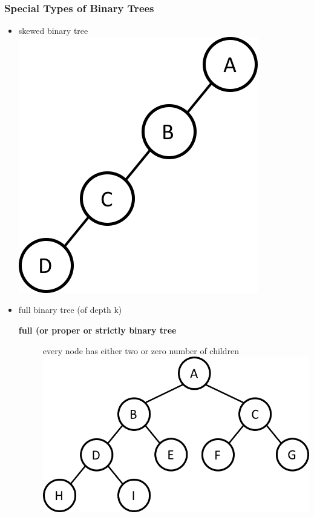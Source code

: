 \documentclass[newPxFont,sthlmFooter,nooffset]{beamer}
\begin{document}
\begin{frame}[t, allowframebreaks]
  \frametitle{Special Types of Binary Trees}
  \begin{itemize}
  \item skewed binary tree \\
     \includegraphics[height=0.3\textheight]{figures/fig06_skewed.png}
\newpage
~\bigskip
  \item full binary tree (of depth k) 
    \begin{description}
    \item[\textbf{full (or proper or strictly binary tree}] every node has either two or zero number of children \\
 
        \includegraphics[height=0.3\textheight]{figures/fig06_full.png}
 

\end{description}
\end{itemize}
\end{frame}
\end{document}

